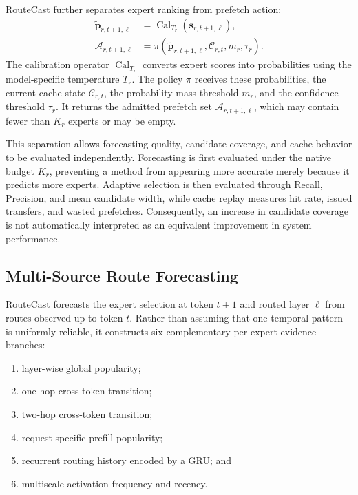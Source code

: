 \documentclass[conference]{IEEEtran}
\begin{document}
RouteCast further separates expert ranking from prefetch action:
\begin{align}
\widetilde{\mathbf{p}}_{r,t+1,\ell}
&=
\operatorname{Cal}_{T_r}\!\left(
\mathbf{s}_{r,t+1,\ell}
\right), \\
\mathcal{A}_{r,t+1,\ell}
&=
\pi\!\left(
\widetilde{\mathbf{p}}_{r,t+1,\ell},
\mathcal{C}_{r,t},
m_r,
\tau_r
\right).
\label{eq:decision-stack}
\end{align}
The calibration operator $\operatorname{Cal}_{T_r}$ converts expert scores
into probabilities using the model-specific temperature $T_r$. The policy
$\pi$ receives these probabilities, the current cache state
$\mathcal{C}_{r,t}$, the probability-mass threshold $m_r$, and the confidence
threshold $\tau_r$. It returns the admitted prefetch set
$\mathcal{A}_{r,t+1,\ell}$, which may contain fewer than $K_r$ experts or may
be empty.

This separation allows forecasting quality, candidate coverage, and cache
behavior to be evaluated independently. Forecasting is first evaluated under
the native budget $K_r$, preventing a method from appearing more accurate
merely because it predicts more experts. Adaptive selection is then evaluated
through Recall, Precision, and mean candidate width, while cache replay
measures hit rate, issued transfers, and wasted prefetches. Consequently, an
increase in candidate coverage is not automatically interpreted as an
equivalent improvement in system performance.
\subsection{Multi-Source Route Forecasting}

RouteCast forecasts the expert selection at token \(t+1\) and routed layer
\(\ell\) from routes observed up to token \(t\). Rather than assuming that one
temporal pattern is uniformly reliable, it constructs six complementary
per-expert evidence branches:

\begin{enumerate}
    \item layer-wise global popularity;
    \item one-hop cross-token transition;
    \item two-hop cross-token transition;
    \item request-specific prefill popularity;
    \item recurrent routing history encoded by a GRU; and
    \item multiscale activation frequency and recency.
\end{enumerate}
\end{document}
